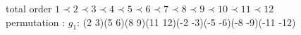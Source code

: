 
total order $ 1 \prec 2 \prec 3 \prec 4 \prec 5 \prec 6 \prec 7 \prec 8 \prec 9 \prec 10 \prec 11 \prec 12$\\
permutation : $g_1$: (2 3)(5 6)(8 9)(11 12)(-2 -3)(-5 -6)(-8 -9)(-11 -12)
